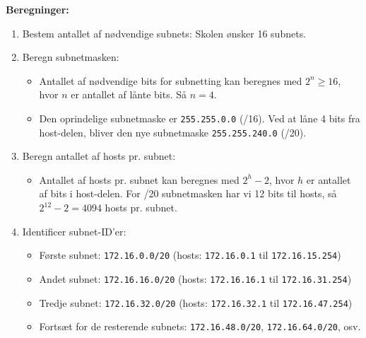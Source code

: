 \textbf{Beregninger:}
\begin{enumerate}
	\item Bestem antallet af nødvendige subnets: Skolen ønsker 16 subnets.
	\item Beregn subnetmasken:
	\begin{itemize}
		\item Antallet af nødvendige bits for subnetting kan beregnes med \(2^n \geq 16\), hvor \(n\) er antallet af lånte bits. Så \(n = 4\).
		\item Den oprindelige subnetmaske er \texttt{255.255.0.0} (/16). Ved at låne 4 bits fra host-delen, bliver den nye subnetmaske \texttt{255.255.240.0} (/20).
	\end{itemize}
	\item Beregn antallet af hosts pr. subnet:
	\begin{itemize}
		\item Antallet af hosts pr. subnet kan beregnes med \(2^h - 2\), hvor \(h\) er antallet af bits i host-delen. For /20 subnetmasken har vi 12 bits til hosts, så \(2^{12} - 2 = 4094\) hosts pr. subnet.
	\end{itemize}
	\item Identificer subnet-ID'er:
	\begin{itemize}
		\item Første subnet: \texttt{172.16.0.0/20} (hosts: \texttt{172.16.0.1} til \texttt{172.16.15.254})
		\item Andet subnet: \texttt{172.16.16.0/20} (hosts: \texttt{172.16.16.1} til \texttt{172.16.31.254})
		\item Tredje subnet: \texttt{172.16.32.0/20} (hosts: \texttt{172.16.32.1} til \texttt{172.16.47.254})
		\item Fortsæt for de resterende subnets: \texttt{172.16.48.0/20}, \texttt{172.16.64.0/20}, osv.
	\end{itemize}
\end{enumerate}

